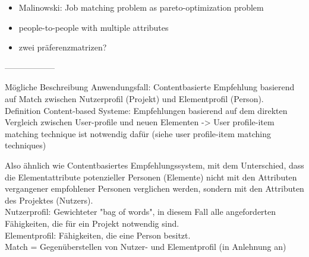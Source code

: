 \begin{itemize}
    \begin{itemize}
        \item Malinowski: Job matching problem as pareto-optimization problem %
    \end{itemize}
    \begin{itemize}
        \item people-to-people with multiple attributes %
    \end{itemize}
    \begin{itemize}
        \item zwei präferenzmatrizen? %
    \end{itemize}
\end{itemize}

------------------

Mögliche Beschreibung Anwendungsfall: %
Contentbasierte Empfehlung basierend auf Match zwischen Nutzerprofil (Projekt) und Elementprofil (Person).\\
Definition Content-based Systeme: Empfehlungen basierend auf dem direkten Vergleich zwischen User-profile und neuen Elementen -> User profile-item matching technique ist notwendig dafür (siehe user profile-item matching techniques) %

Also ähnlich wie Contentbasiertes Empfehlungssystem, mit dem Unterschied, dass die Elementattribute potenzieller Personen (Elemente) nicht mit den Attributen vergangener empfohlener Personen verglichen werden, sondern mit den Attributen des Projektes (Nutzers).\\
Nutzerprofil: Gewichteter "bag of words", in diesem Fall alle angeforderten Fähigkeiten, die für ein Projekt notwendig sind.\\
Elementprofil: Fähigkeiten, die eine Person besitzt.\\
Match = Gegenüberstellen von  Nutzer- und Elementprofil (in Anlehnung an) %

